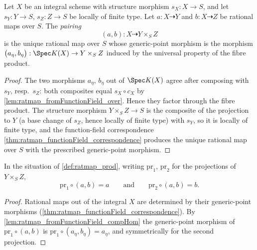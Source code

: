 \begin{definition}
  \label{def:ratmap_prod}
  \leanok
  Let \(X\) be an integral scheme with structure morphism \(s_X : X \to S\), and
  let \(s_Y : Y \to S\), \(s_Z : Z \to S\) be locally of finite type. Let
  \(a : X \dashrightarrow Y\) and \(b : X \dashrightarrow Z\) be rational maps
  over \(S\). The \emph{pairing}
  \[
    (a, b) : X \dashrightarrow Y \times_S Z
  \]
  is the unique rational map over \(S\) whose generic-point morphism is the
  morphism \(\bigl(a_\eta, b_\eta\bigr) : \Spec K(X) \to Y \times_S Z\) induced
  by the universal property of the fibre product.
\end{definition}
\begin{proof}
  \leanok
  The two morphisms \(a_\eta\), \(b_\eta\) out of \(\Spec K(X)\) agree after
  composing with \(s_Y\), resp.\ \(s_Z\): both composites equal
  \(s_X \circ c_X\) by \ref{lem:ratmap_fromFunctionField_over}. Hence they
  factor through the fibre product. The structure morphism
  \(Y \times_S Z \to S\) is the composite of the projection to \(Y\) (a base
  change of \(s_Z\), hence locally of finite type) with \(s_Y\), so it is
  locally of finite type, and the function-field correspondence
  \ref{thm:ratmap_functionField_correspondence} produces the unique rational
  map over \(S\) with the prescribed generic-point morphism.
\end{proof}

\begin{lemma}
  \label{lem:ratmap_prod_proj}
  \leanok
  In the situation of \ref{def:ratmap_prod}, writing \(\mathrm{pr}_1\),
  \(\mathrm{pr}_2\) for the projections of \(Y \times_S Z\),
  \[
    \mathrm{pr}_1 \circ (a,b) = a
    \qquad\text{and}\qquad
    \mathrm{pr}_2 \circ (a,b) = b .
  \]
\end{lemma}
\begin{proof}
  \leanok
  Rational maps out of the integral \(X\) are determined by their generic-point
  morphisms (\ref{thm:ratmap_functionField_correspondence}). By
  \ref{lem:ratmap_fromFunctionField_compHom} the generic-point morphism of
  \(\mathrm{pr}_1 \circ (a,b)\) is \(\mathrm{pr}_1 \circ (a_\eta, b_\eta) =
  a_\eta\), and symmetrically for the second projection.
\end{proof}

